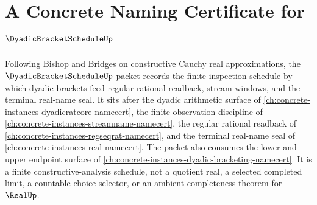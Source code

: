 \chapter{A Concrete Naming Certificate for $\DyadicBracketScheduleUp$}
\label{ch:concrete-instances-dyadic-bracket-schedule-namecert}

Following Bishop and Bridges on constructive Cauchy real approximations, the $\DyadicBracketScheduleUp$ packet records the finite inspection schedule by which dyadic brackets feed regular rational readback, stream windows, and the terminal real-name seal. It sits after the dyadic arithmetic surface of \autoref{ch:concrete-instances-dyadicratcore-namecert}, the finite observation discipline of \autoref{ch:concrete-instances-streamname-namecert}, the regular rational readback of \autoref{ch:concrete-instances-regseqrat-namecert}, and the terminal real-name seal of \autoref{ch:concrete-instances-real-namecert}. The packet also consumes the lower-and-upper endpoint surface of \autoref{ch:concrete-instances-dyadic-bracketing-namecert}. It is a finite constructive-analysis schedule, not a quotient real, a selected completed limit, a countable-choice selector, or an ambient completeness theorem for $\RealUp$.

